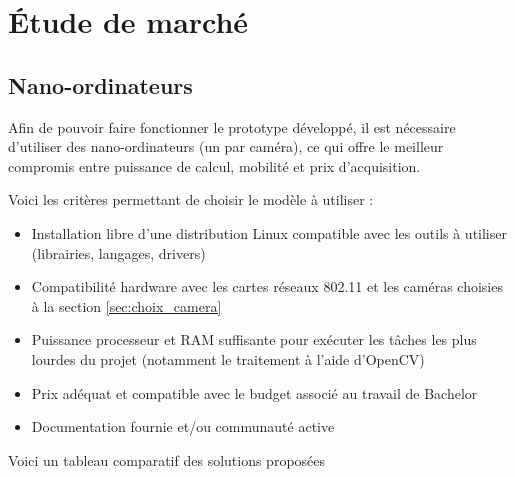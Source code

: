 \chapter{Étude de marché}
\label{ch:etude-de-marche}

\section{Nano-ordinateurs}

Afin de pouvoir faire fonctionner le prototype développé, il est nécessaire d’utiliser des nano-ordinateurs (un par
caméra), ce qui offre le meilleur compromis entre puissance de calcul, mobilité et prix d’acquisition.

Voici les critères permettant de choisir le modèle à utiliser :
\begin{itemize}
\item Installation libre d’une distribution Linux compatible avec les outils à utiliser (librairies, langages, drivers)
\item Compatibilité hardware avec les cartes réseaux 802.11 et les caméras choisies à la section \ref{sec:choix_camera}
\item Puissance processeur et RAM suffisante pour exécuter les tâches les plus lourdes du projet (notamment le traitement à l'aide d'OpenCV)
\item Prix adéquat et compatible avec le budget associé au travail de Bachelor
\item Documentation fournie et/ou communauté active
\end{itemize}

Voici un tableau comparatif des solutions proposées

